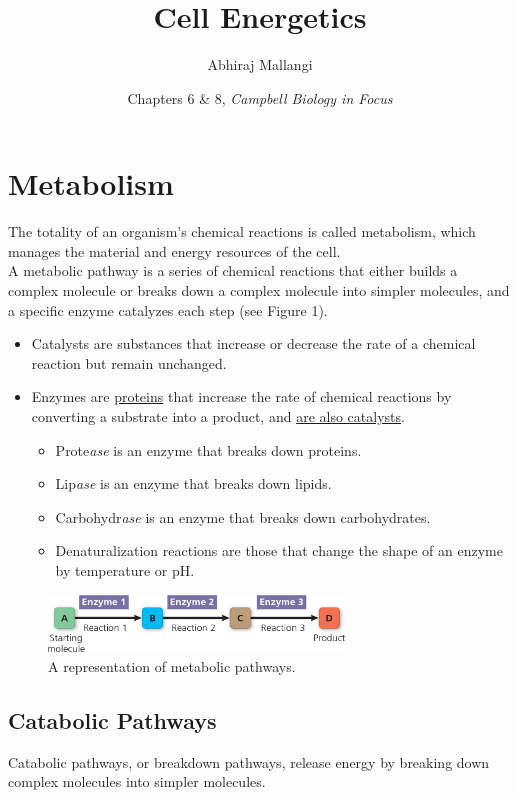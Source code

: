 \documentclass[a4paper]{article}
\title{\textbf{Cell Energetics}}
\author{Abhiraj Mallangi}
\date{Chapters 6 \& 8, \textit{Campbell Biology in Focus}}
\begin{document}
\maketitle

\tableofcontents
\newpage

\section{Metabolism}
The totality of an organism's chemical reactions is called \color{red} metabolism\color{black}, which manages the material and energy resources of the cell.\\

A \color{red}metabolic pathway \color{black} is a series of chemical reactions that either builds a complex molecule or breaks down a complex molecule into simpler molecules, and a specific enzyme catalyzes each step (see Figure 1).

\begin{itemize}
	\item Catalysts are substances that increase or decrease the rate of a chemical reaction but remain unchanged.
	\item Enzymes are \underline{proteins} that increase the rate of chemical reactions by converting a substrate into a product, and \underline{are also catalysts}.
		\begin{itemize}
			\item Prote\textit{ase} is an enzyme that breaks down proteins.
			\item Lip\textit{ase} is an enzyme that breaks down lipids.
			\item Carbohydr\textit{ase} is an enzyme that breaks down carbohydrates.
			\item Denaturalization reactions are those that change the shape of an enzyme by temperature or pH.
		\end{itemize}
\end{itemize}

\begin{figure}[h!]
\centering
\includegraphics[width=0.7\textwidth]{figure_one.jpeg}
\caption{A representation of metabolic pathways.}
\end{figure}

\subsection{Catabolic Pathways}
\color{red}Catabolic pathways\color{black}, or breakdown pathways, release energy by breaking down complex molecules into simpler molecules.
\end{document}
